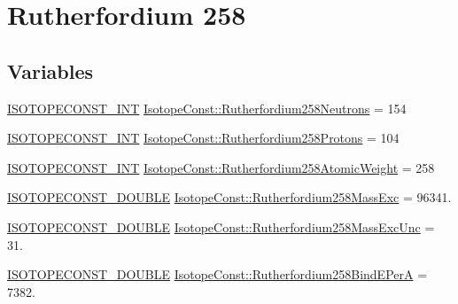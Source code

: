 \hypertarget{group___isotope_const-_rutherfordium-_rf258}{}\section{Rutherfordium 258}
\label{group___isotope_const-_rutherfordium-_rf258}
\subsection*{Variables}
\begin{DoxyCompactItemize}
\item 
\mbox{\hyperlink{group___isotope_const-_macros_ga5f18360b3e99483a35c32d789e62621c}{I\+S\+O\+T\+O\+P\+E\+C\+O\+N\+S\+T\+\_\+\+I\+NT}} \mbox{\hyperlink{group___isotope_const-_rutherfordium-_rf258_gab5bec0f4e86986aec09426c66d92c419}{Isotope\+Const\+::\+Rutherfordium258\+Neutrons}} = 154
\item 
\mbox{\hyperlink{group___isotope_const-_macros_ga5f18360b3e99483a35c32d789e62621c}{I\+S\+O\+T\+O\+P\+E\+C\+O\+N\+S\+T\+\_\+\+I\+NT}} \mbox{\hyperlink{group___isotope_const-_rutherfordium-_rf258_ga42791ccade2b7152b17a37f98e66a0cf}{Isotope\+Const\+::\+Rutherfordium258\+Protons}} = 104
\item 
\mbox{\hyperlink{group___isotope_const-_macros_ga5f18360b3e99483a35c32d789e62621c}{I\+S\+O\+T\+O\+P\+E\+C\+O\+N\+S\+T\+\_\+\+I\+NT}} \mbox{\hyperlink{group___isotope_const-_rutherfordium-_rf258_ga4e95be114a773b6bae4e256ca2ef074b}{Isotope\+Const\+::\+Rutherfordium258\+Atomic\+Weight}} = 258
\item 
\mbox{\hyperlink{group___isotope_const-_macros_ga8f45a7272ce02c0b4c65c44636ed719a}{I\+S\+O\+T\+O\+P\+E\+C\+O\+N\+S\+T\+\_\+\+D\+O\+U\+B\+LE}} \mbox{\hyperlink{group___isotope_const-_rutherfordium-_rf258_gac0b7d26b1eff533037fa704409227b1b}{Isotope\+Const\+::\+Rutherfordium258\+Mass\+Exc}} = 96341.
\item 
\mbox{\hyperlink{group___isotope_const-_macros_ga8f45a7272ce02c0b4c65c44636ed719a}{I\+S\+O\+T\+O\+P\+E\+C\+O\+N\+S\+T\+\_\+\+D\+O\+U\+B\+LE}} \mbox{\hyperlink{group___isotope_const-_rutherfordium-_rf258_gafb03200ef74bbad8d768283549768b92}{Isotope\+Const\+::\+Rutherfordium258\+Mass\+Exc\+Unc}} = 31.
\item 
\mbox{\hyperlink{group___isotope_const-_macros_ga8f45a7272ce02c0b4c65c44636ed719a}{I\+S\+O\+T\+O\+P\+E\+C\+O\+N\+S\+T\+\_\+\+D\+O\+U\+B\+LE}} \mbox{\hyperlink{group___isotope_const-_rutherfordium-_rf258_ga36052d812d781cc29deab2630e44ff66}{Isotope\+Const\+::\+Rutherfordium258\+Bind\+E\+PerA}} = 7382.

\end{DoxyCompactItemize}
